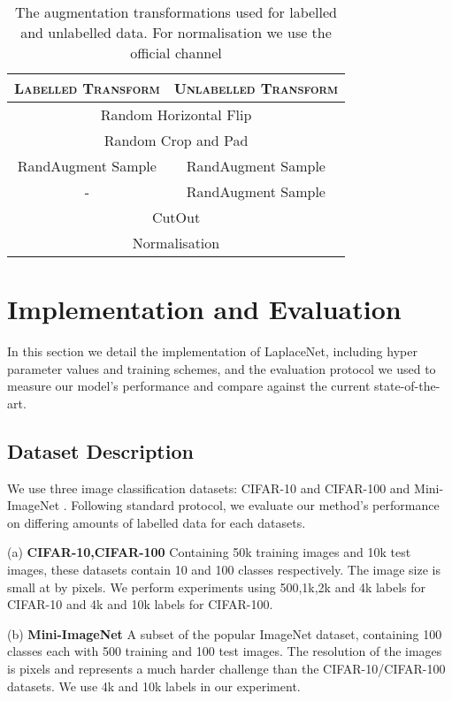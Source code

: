 \documentclass[journal]{IEEEtran}
\begin{document}
\begin{table}[t]
    \caption{The augmentation transformations used for labelled and unlabelled data. For normalisation we use the official channel}
    \centering
    \vspace{5pt}
    \begin{tabular}{|c|c|} 
    \hline
    \cellcolor{gray!25} \textsc{Labelled Transform} & \cellcolor{gray!25} \textsc{Unlabelled Transform}  \\ \hline \hline
    \multicolumn{2}{|c|}{Random Horizontal Flip}  \\ 
    \multicolumn{2}{|c|}{Random Crop and Pad}  \\ \hline
    RandAugment Sample & RandAugment Sample \\
    -  & RandAugment Sample \\ \hline
    \multicolumn{2}{|c|}{CutOut} \\ 
    \multicolumn{2}{|c|}{Normalisation} \\ \hline
    \end{tabular}
    \label{aug-table}
\end{table}


\section{Implementation and Evaluation}
In this section we detail the implementation of LaplaceNet, including hyper parameter values and training schemes, and the evaluation protocol we used to measure our model's performance and compare against the current state-of-the-art. 

\subsection{Dataset Description}
We use three image classification datasets: CIFAR-10 and CIFAR-100 \cite{cifardata} and Mini-ImageNet \cite{oneshotMiniImage}. Following standard protocol, we evaluate our method's performance on differing amounts of labelled data for each datasets.

(a) \textbf{CIFAR-10,CIFAR-100} Containing 50k training images and 10k test images, these datasets contain 10 and 100 classes respectively. The image size is small at  by  pixels.  We perform experiments using 500,1k,2k and 4k labels for CIFAR-10 and 4k and 10k labels for CIFAR-100.

(b) \textbf{Mini-ImageNet} A subset of the popular ImageNet dataset, containing 100 classes each with 500 training and 100 test images. The resolution of the images is  pixels and represents a much harder challenge than the CIFAR-10/CIFAR-100 datasets. We use 4k and 10k labels in our experiment. 
\end{document}
